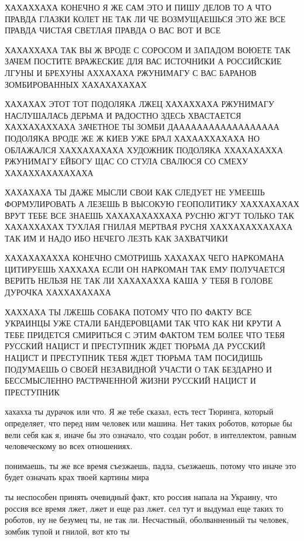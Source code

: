 ХАХАХХАХА КОНЕЧНО Я ЖЕ САМ ЭТО И ПИШУ ДЕЛОВ ТО А ЧТО ПРАВДА ГЛАЗКИ КОЛЕТ НЕ ТАК
ЛИ ЧЕ ВОЗМУЩАЕШЬСЯ ЭТО ЖЕ ВСЕ ПРАВДА ЧИСТАЯ СВЕТЛАЯ ПРАВДА О ВАС ВОТ И ВСЕ

ХАХАХХАХА ТАК ВЫ Ж ВРОДЕ С СОРОСОМ И ЗАПАДОМ ВОЮЕТЕ ТАК ЗАЧЕМ ПОСТИТЕ ВРАЖЕСКИЕ
ДЛЯ ВАС ИСТОЧНИКИ А РОССИЙСКИЕ ЛГУНЫ И БРЕХУНЫ АХХАХАХА РЖУНИМАГУ С ВАС БАРАНОВ
ЗОМБИРОВАННЫХ ХАХАХАХАХАХ

ХАХАХАХ ЭТОТ ТОТ ПОДОЛЯКА ЛЖЕЦ ХАХАХХАХА РЖУНИМАГУ НАСЛУШАЛАСЬ ДЕРЬМА И
РАДОСТНО ЗДЕСЬ ХВАСТАЕТСЯ ХАХХАХАХХАХА ЗАЧЕТНОЕ ТЫ ЗОМБИ ДАААААААААААААААААА
ПОДОЛЯКА ВРОДЕ ЖЕ Ж КИЕВ УЖЕ БРАЛ ХАХААХХАХАХА НО ОБЛАЖАЛСЯ ХАХХАХАХАХА
ХУДОЖНИК ПОДОЛЯКА ХХАХАХАХХА РЖУНИМАГУ ЕЙБОГУ ЩАС СО СТУЛА СВАЛЮСЯ СО СМЕХУ
ХАХАХХАХАХАХАХА

ХАХАХАХА ТЫ ДАЖЕ МЫСЛИ СВОИ КАК СЛЕДУЕТ НЕ УМЕЕШЬ ФОРМУЛИРОВАТЬ А ЛЕЗЕШЬ В
ВЫСОКУЮ ГЕОПОЛИТИКУ ХАХХАХАХАХ ВРУТ ТЕБЕ ВСЕ ЗНАЕШЬ ХАХАХАХАХХАХА РУСНЮ ЖГУТ
ТОЛЬКО ТАК ХАХАХХАХАХ ТУХЛАЯ ГНИЛАЯ МЕРТВАЯ РУСНЯ ХАХХАХАХХАХАХА ТАК ИМ И НАДО
ИБО НЕЧЕГО ЛЕЗТЬ КАК ЗАХВАТЧИКИ

ХАХАХАХАХХА КОНЕЧНО СМОТРИШЬ ХАХАХАХ ЧЕГО НАРКОМАНА ЦИТИРУЕШЬ ХАХХАХА ЕСЛИ ОН
НАРКОМАН ТАК ЕМУ ПОЛУЧАЕТСЯ ВЕРИТЬ НЕЛЬЗЯ НЕ ТАК ЛИ ХАХАХАХХА КАША У ТЕБЯ В
ГОЛОВЕ ДУРОЧКА ХАХХАХАХАХА


ХАХХАХА ТЫ ЛЖЕШЬ СОБАКА ПОТОМУ ЧТО ПО ФАКТУ ВСЕ УКРАИНЦЫ УЖЕ СТАЛИ БАНДЕРОВЦАМИ
ТАК ЧТО КАК НИ КРУТИ А ТЕБЕ ПРИДЕТСЯ СМИРИТЬСЯ С ЭТИМ ФАКТОМ ТЕМ БОЛЕЕ ЧТО ТЕБЯ
РУССКИЙ НАЦИСТ И ПРЕСТУПНИК ЖДЕТ ТЮРЬМА ДА РУССКИЙ НАЦИСТ И ПРЕСТУПНИК ТЕБЯ
ЖДЕТ ТЮРЬМА ТАМ ПОСИДИШЬ ПОДУМАЕШЬ О СВОЕЙ НЕЗАВИДНОЙ УЧАСТИ О ТАК БЕЗДАРНО И
БЕССМЫСЛЕННО РАСТРАЧЕННОЙ ЖИЗНИ РУССКИЙ НАЦИСТ И ПРЕСТУПНИК

хахахха ты дурачок или что. Я же тебе сказал, есть тест Тюринга, который
определяет, что перед ним человек или машина. Нет таких роботов, которые бы
вели себя как я, иначе бы это означало, что создан робот, в интеллектом, равным
человеческому во всех отношениях.

понимаешь, ты же все время съезжаешь, падла, съезжаешь, потому что иначе это
будет означать крах твоей картины мира

ты неспособен принять очевидный факт, кто россия напала на Украину, что россия
все время лжет, лжет и еще раз лжет. сел тут и выдумал еще таких то роботов, ну
не безумец ты, не так ли. Несчастный, оболванненный ты человек, зомбик тупой и
гнилой, вот кто ты

